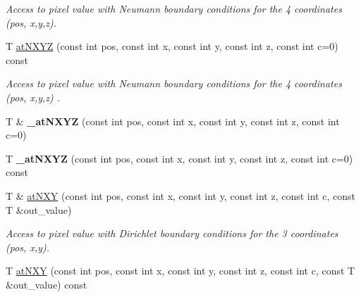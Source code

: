 \begin{DoxyCompactItemize}
\begin{DoxyCompactList}\small\item\em Access to pixel value with Neumann boundary conditions for the 4 coordinates ({\ttfamily pos}, {\ttfamily x},{\ttfamily y},{\ttfamily z}). \end{DoxyCompactList}\item 
\mbox{\label{structcimg__library__suffixed_1_1CImgList_a16c8d7b0432c3290f42749dcc10fd2ed}} 
T \hyperlink{structcimg__library__suffixed_1_1CImgList_a16c8d7b0432c3290f42749dcc10fd2ed}{at\+N\+X\+YZ} (const int pos, const int x, const int y, const int z, const int c=0) const
\begin{DoxyCompactList}\small\item\em Access to pixel value with Neumann boundary conditions for the 4 coordinates ({\ttfamily pos}, {\ttfamily x},{\ttfamily y},{\ttfamily z}) . \end{DoxyCompactList}\item 
\mbox{\label{structcimg__library__suffixed_1_1CImgList_a9d8943cf916f4869a4aba1b925a7b7b6}} 
T \& {\bfseries \+\_\+at\+N\+X\+YZ} (const int pos, const int x, const int y, const int z, const int c=0)
\item 
\mbox{\label{structcimg__library__suffixed_1_1CImgList_a34b8ad13b233603706c9f30563d279d3}} 
T {\bfseries \+\_\+at\+N\+X\+YZ} (const int pos, const int x, const int y, const int z, const int c=0) const
\item 
T \& \hyperlink{structcimg__library__suffixed_1_1CImgList_a3f86d4aee684612ab167a8d4419ad18c}{at\+N\+XY} (const int pos, const int x, const int y, const int z, const int c, const T \&out\+\_\+value)
\begin{DoxyCompactList}\small\item\em Access to pixel value with Dirichlet boundary conditions for the 3 coordinates ({\ttfamily pos}, {\ttfamily x},{\ttfamily y}). \end{DoxyCompactList}\item 
\mbox{\label{structcimg__library__suffixed_1_1CImgList_a7ea7315ffe9bd28eadec75695bc34629}} 
T \hyperlink{structcimg__library__suffixed_1_1CImgList_a7ea7315ffe9bd28eadec75695bc34629}{at\+N\+XY} (const int pos, const int x, const int y, const int z, const int c, const T \&out\+\_\+value) const

\end{DoxyCompactItemize}
